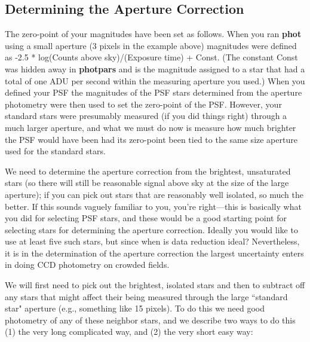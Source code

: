 \subsection{Determining the Aperture Correction}
 
The zero-point of your magnitudes have been set as follows.  When you
ran {\bf phot} using a small aperture (3 pixels in the example above)
magnitudes were defined as -2.5 * log{(Counts above sky)/(Exposure
time)} + Const.
(The constant Const was hidden away in {\bf photpars} and is the
magnitude assigned to a star that had a total of  one ADU per second 
within the measuring aperture you used.)  When you defined your PSF the
magnitudes of the PSF stars determined from the aperture photometry were
then used to set the zero-point of the PSF.  However, your standard
stars were presumably measured (if you did things right) through a much
larger aperture, and what we must do now is measure how much brighter
the PSF would have been had its zero-point been tied to the same size
aperture used for the standard stars.  
 
We need to determine the aperture correction from the brightest, 
unsaturated stars (so there will still be reasonable signal above sky
at the size of the large aperture); if you can pick out stars that are
reasonably well isolated, so much the better.  If this sounds vaguely
familiar to you, you're right---this is basically what you did for
selecting PSF stars, and these would be a good starting point for
selecting stars for determining the aperture correction.  Ideally you
would like to use at least five such stars, but since when is data
reduction ideal?  Nevertheless, it is in the determination of the
aperture correction the largest uncertainty enters in doing CCD
photometry on crowded fields.
 
We will first need to pick out the brightest, isolated stars and then
to subtract off any stars that might affect their being measured through
the large ``standard star" aperture (e.g., something like 15 pixels).
To do this we need good photometry of any of these neighbor stars, and
we describe two ways to do this (1) the very long complicated way, and
(2) the very short easy way:
 
